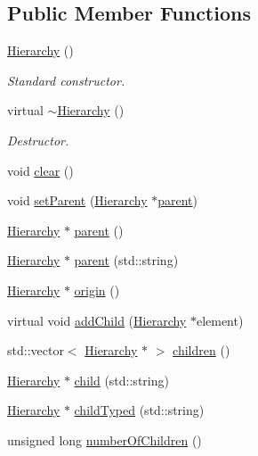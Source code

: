 \subsection*{Public Member Functions}
\begin{DoxyCompactItemize}
\item 
\hyperlink{classHierarchy_a8288ae6edc7482d6a9f83f94c0ca93db}{Hierarchy} ()
\begin{DoxyCompactList}\small\item\em Standard constructor. \end{DoxyCompactList}\item 
virtual \hyperlink{classHierarchy_a8f29c4c38606352e2472d95b08c503d0}{$\sim$\+Hierarchy} ()
\begin{DoxyCompactList}\small\item\em Destructor. \end{DoxyCompactList}\item 
void \hyperlink{classHierarchy_af4d43b0765b402670eed2d62c73405af}{clear} ()
\item 
void \hyperlink{classHierarchy_a585ad1aeec16077a0e532ab8b4fc557b}{set\+Parent} (\hyperlink{classHierarchy}{Hierarchy} $\ast$\hyperlink{classHierarchy_a1c7bec8257e717f9c1465e06ebf845fc}{parent})
\item 
\hyperlink{classHierarchy}{Hierarchy} $\ast$ \hyperlink{classHierarchy_a1c7bec8257e717f9c1465e06ebf845fc}{parent} ()
\item 
\hyperlink{classHierarchy}{Hierarchy} $\ast$ \hyperlink{classHierarchy_ad550588733bf75ac5c0fcfd7c8fd11a6}{parent} (std\+::string)
\item 
\hyperlink{classHierarchy}{Hierarchy} $\ast$ \hyperlink{classHierarchy_aee461dc930ce3871636ff87f075b1b83}{origin} ()
\item 
virtual void \hyperlink{classHierarchy_ad677774ff38fcb257c04a3a10d471fac}{add\+Child} (\hyperlink{classHierarchy}{Hierarchy} $\ast$element)
\item 
std\+::vector$<$ \hyperlink{classHierarchy}{Hierarchy} $\ast$ $>$ \hyperlink{classHierarchy_aa9a76f69e98e052ee1a6e32cea006288}{children} ()
\item 
\hyperlink{classHierarchy}{Hierarchy} $\ast$ \hyperlink{classHierarchy_a1e207f973c694b538bf90107b4868817}{child} (std\+::string)
\item 
\hyperlink{classHierarchy}{Hierarchy} $\ast$ \hyperlink{classHierarchy_a0c15a5276a3b80b4354d6bd8a01e0708}{child\+Typed} (std\+::string)
\item 
unsigned long \hyperlink{classHierarchy_ab16e84de65fd84e14001a6cf941c8be4}{number\+Of\+Children} ()

\end{DoxyCompactItemize}
